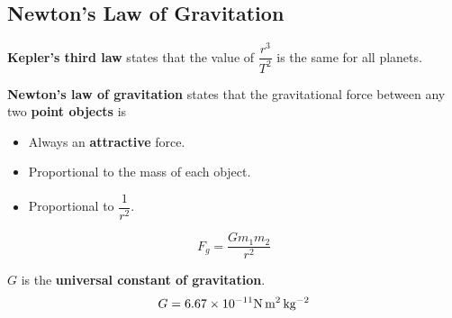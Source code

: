 \subsection{Newton's Law of Gravitation}

\textbf{Kepler's third law} states that the value of $\dfrac{r^3}{T^2}$ is the same for all planets.

\textbf{Newton's law of gravitation} states that the gravitational force between any two \textbf{point objects} is
\begin{itemize}
    \item Always an \textbf{attractive} force.
    \item Proportional to the mass of each object.
    \item Proportional to $\dfrac{1}{r^2}$.
\end{itemize}
$$F_g=\frac{Gm_1m_2}{r^2}$$

$G$ is the \textbf{universal constant of gravitation}.
$$G=6.67\times10^{-11}\text{N\,m$^2$\,kg$^{-2}$}$$
